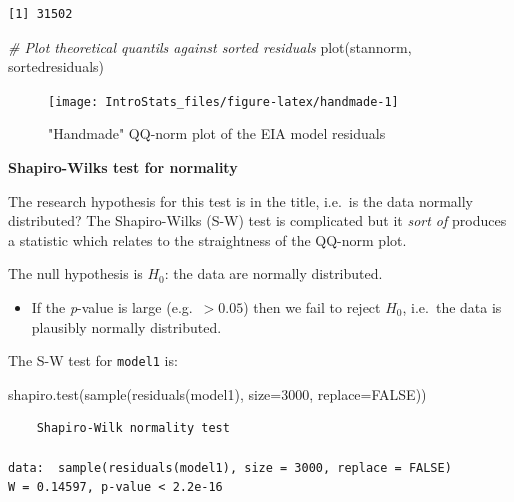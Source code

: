 \documentclass[
  oneside]{krantz}
\newenvironment{Shaded}{\begin{snugshade}}{\end{snugshade}}
\newcommand{\AttributeTok}[1]{\textcolor[rgb]{0.77,0.63,0.00}{#1}}
\newcommand{\CommentTok}[1]{\textcolor[rgb]{0.56,0.35,0.01}{\textit{#1}}}
\newcommand{\ConstantTok}[1]{\textcolor[rgb]{0.00,0.00,0.00}{#1}}
\newcommand{\DecValTok}[1]{\textcolor[rgb]{0.00,0.00,0.81}{#1}}
\newcommand{\FunctionTok}[1]{\textcolor[rgb]{0.00,0.00,0.00}{#1}}
\newcommand{\NormalTok}[1]{#1}
\providecommand{\tightlist}{%
  \setlength{\itemsep}{0pt}\setlength{\parskip}{0pt}}
\begin{document}
\begin{verbatim}
[1] 31502
\end{verbatim}

\begin{Shaded}
\begin{Highlighting}[]
\CommentTok{\# Plot theoretical quantils against sorted residuals}
\FunctionTok{plot}\NormalTok{(stannorm, sortedresiduals)}
\end{Highlighting}
\end{Shaded}

\begin{figure}

{\centering \texttt{[image: IntroStats\_files/figure-latex/handmade-1]} 

}

\caption{"Handmade" QQ-norm plot of the EIA model residuals}\label{fig:handmade}
\end{figure}

\textbf{Shapiro-Wilks test for normality}

The research hypothesis for this test is in the title, i.e.~is the data normally distributed? The Shapiro-Wilks (S-W) test is complicated but it \emph{sort of} produces a statistic which relates to the straightness of the QQ-norm plot.

The null hypothesis is \(H_0\): the data are normally distributed.

\begin{itemize}
\tightlist
\item
  If the \emph{p}-value is large (e.g.~\(>0.05\)) then we fail to reject \(H_0\), i.e.~the data is plausibly normally distributed.
\end{itemize}

The S-W test for \texttt{model1} is:

\begin{Shaded}
\begin{Highlighting}[]
\FunctionTok{shapiro.test}\NormalTok{(}\FunctionTok{sample}\NormalTok{(}\FunctionTok{residuals}\NormalTok{(model1), }\AttributeTok{size=}\DecValTok{3000}\NormalTok{, }\AttributeTok{replace=}\ConstantTok{FALSE}\NormalTok{))}
\end{Highlighting}
\end{Shaded}

\begin{verbatim}
    Shapiro-Wilk normality test

data:  sample(residuals(model1), size = 3000, replace = FALSE)
W = 0.14597, p-value < 2.2e-16
\end{verbatim}
\end{document}
